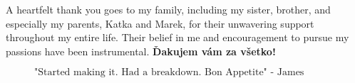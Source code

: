 A heartfelt thank you goes to my family, including my sister, brother, and especially my parents, Katka and Marek, for their unwavering support throughout my entire life. Their belief in me and encouragement to pursue my passions have been instrumental. \textbf{Ďakujem vám za všetko!}

\begin{figure}[b]
$$\mbox{"Started making it. Had a breakdown. Bon Appetite" - James Acaster}$$
\end{figure}







